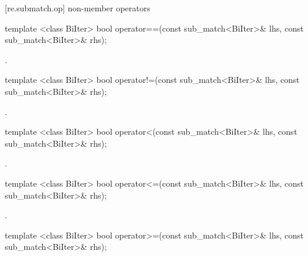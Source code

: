 [re.submatch.op]{ non-member operators}

%
%
\begin{itemdecl}
template <class BiIter>
  bool operator==(const sub_match<BiIter>& lhs, const sub_match<BiIter>& rhs); 
\end{itemdecl}

\begin{itemdescr}
\pnum\returns  {}.
\end{itemdescr}

%
%
\begin{itemdecl}
template <class BiIter>
  bool operator!=(const sub_match<BiIter>& lhs, const sub_match<BiIter>& rhs); 
\end{itemdecl}

\begin{itemdescr}
\pnum\returns {}.
\end{itemdescr}

%
%
\begin{itemdecl}
template <class BiIter>
  bool operator<(const sub_match<BiIter>& lhs, const sub_match<BiIter>& rhs); 
\end{itemdecl}

\begin{itemdescr}
\pnum\returns  {}.
\end{itemdescr}

%
%
\begin{itemdecl}
template <class BiIter>
  bool operator<=(const sub_match<BiIter>& lhs, const sub_match<BiIter>& rhs); 
\end{itemdecl}

\begin{itemdescr}
\pnum\returns  {}.
\end{itemdescr}

%
%
\begin{itemdecl}
template <class BiIter>
  bool operator>=(const sub_match<BiIter>& lhs, const sub_match<BiIter>& rhs); 
\end{itemdecl}


